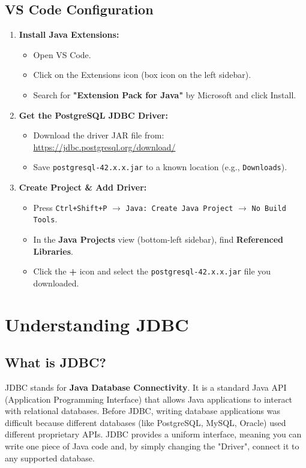 \documentclass[12pt,a4paper]{article}
\begin{document}
\subsection{VS Code Configuration}
\begin{enumerate}
    \item \textbf{Install Java Extensions:}
    \begin{itemize}
        \item Open VS Code.
        \item Click on the Extensions icon (box icon on the left sidebar).
        \item Search for \textbf{"Extension Pack for Java"} by Microsoft and click Install.
    \end{itemize}

    \item \textbf{Get the PostgreSQL JDBC Driver:}
    \begin{itemize}
        \item Download the driver JAR file from: \url{https://jdbc.postgresql.org/download/}
        \item Save \texttt{postgresql-42.x.x.jar} to a known location (e.g., \texttt{Downloads}).
    \end{itemize}

    \item \textbf{Create Project \& Add Driver:}
    \begin{itemize}
        \item Press \texttt{Ctrl+Shift+P} $\rightarrow$ \texttt{Java: Create Java Project} $\rightarrow$ \texttt{No Build Tools}.
        \item In the \textbf{Java Projects} view (bottom-left sidebar), find \textbf{Referenced Libraries}.
        \item Click the \textbf{+} icon and select the \texttt{postgresql-42.x.x.jar} file you downloaded.
    \end{itemize}
\end{enumerate}

\newpage
\section{Understanding JDBC}

\subsection{What is JDBC?}
JDBC stands for \textbf{Java Database Connectivity}. It is a standard Java API (Application Programming Interface) that allows Java applications to interact with relational databases. Before JDBC, writing database applications was difficult because different databases (like PostgreSQL, MySQL, Oracle) used different proprietary APIs. JDBC provides a uniform interface, meaning you can write one piece of Java code and, by simply changing the "Driver", connect it to any supported database.
\end{document}
